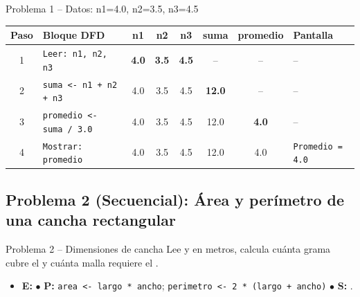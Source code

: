 \documentclass[11pt,letterpaper]{article}
\begin{document}

\begin{pruebaescritorio}{Problema 1 -- Datos: n1=4.0, n2=3.5, n3=4.5}
\begin{center}
\footnotesize
\begin{tabular}{c l c c c c c l}
  \toprule
  \textbf{Paso} & \textbf{Bloque DFD} & \textbf{n1} & \textbf{n2} & \textbf{n3} & \textbf{suma} & \textbf{promedio} & \textbf{Pantalla} \\
  \midrule
  1 & \texttt{Leer: n1, n2, n3} & \textbf{4.0} & \textbf{3.5} & \textbf{4.5} & -- & -- & -- \\
  2 & \texttt{suma <- n1 + n2 + n3} & 4.0 & 3.5 & 4.5 & \textbf{12.0} & -- & -- \\
  3 & \texttt{promedio <- suma / 3.0} & 4.0 & 3.5 & 4.5 & 12.0 & \textbf{4.0} & -- \\
  4 & \texttt{Mostrar: promedio} & 4.0 & 3.5 & 4.5 & 12.0 & 4.0 & \texttt{Promedio = 4.0} \\
  \bottomrule
\end{tabular}
\end{center}
\end{pruebaescritorio}


\subsection{Problema 2 (Secuencial): Área y perímetro de una cancha rectangular}
\begin{analisis}{Problema 2 -- Dimensiones de cancha}
Lee  y  en metros, calcula cuánta grama cubre el  y cuánta malla requiere el .
\begin{itemize}
  \item \textbf{E:}  \quad $\bullet$ \textbf{P:} \texttt{area <- largo * ancho}; \texttt{perimetro <- 2 * (largo + ancho)} \quad $\bullet$ \textbf{S:} .
\end{itemize}
\end{analisis}

\end{document}
